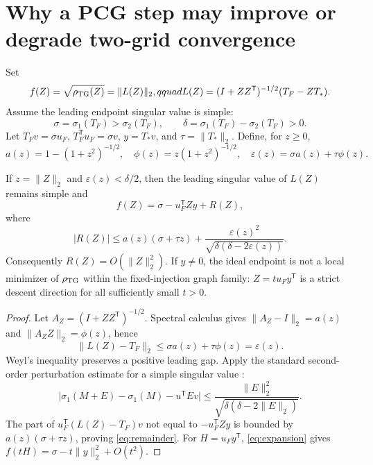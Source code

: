 \documentclass[smallextended]{svjour3}
\newcommand{\T}{\mathsf{T}}
\newcommand{\norm}[1]{\lVert#1\rVert}
\newcommand{\abs}[1]{\lvert#1\rvert}
\begin{document}
\section{Why a PCG step may improve or degrade two-grid convergence}\label{sec:local}
Set
\begin{equation}\label{eq:L}
 f(Z)=\sqrt{\rho_{\rm TG}(Z)}=\norm{L(Z)}_2,qquad
 L(Z)=(I+ZZ^\T)^{-1/2}(T_F-ZT_*).
\end{equation}
Assume the leading endpoint singular value is simple:
\begin{equation}\label{eq:gap}
 \sigma=\sigma_1(T_F)>\sigma_2(T_F),\qquad
 \delta=\sigma_1(T_F)-\sigma_2(T_F)>0.
\end{equation}
Let $T_Fv=\sigma u_F$, $T_F^{\T}u_F=\sigma v$, $y=T_*v$, and $\tau=\norm{T_*}_2$. Define, for $z\ge0$,
\begin{equation}\label{eq:eps}
 a(z)=1-(1+z^2)^{-1/2},\quad
 \phi(z)=z(1+z^2)^{-1/2},\quad
 \varepsilon(z)=\sigma a(z)+\tau\phi(z).
\end{equation}

\begin{theorem}\label{thm:expansion}
If $z=\norm Z_2$ and $\varepsilon(z)<\delta/2$, then the leading singular value of $L(Z)$ remains simple and
\begin{equation}\label{eq:expansion}
 f(Z)=\sigma-u_F^{\T}Zy+R(Z),
\end{equation}
where
\begin{equation}\label{eq:remainder}
 \abs{R(Z)}\le
 a(z)(\sigma+\tau z)+
 \frac{\varepsilon(z)^2}{\sqrt{\delta(\delta-2\varepsilon(z))}}.
\end{equation}
Consequently $R(Z)=O(\norm Z_2^2)$. If $y\ne0$, the ideal endpoint is not a local minimizer of $\rho_{\rm TG}$ within the fixed-injection graph family: $Z=t u_Fy^\T$ is a strict descent direction for all sufficiently small $t>0$.
\end{theorem}
\begin{proof}
Let $A_Z=(I+ZZ^\T)^{-1/2}$. Spectral calculus gives
$\norm{A_Z-I}_2=a(z)$ and $\norm{A_ZZ}_2=\phi(z)$, hence
\begin{equation*}
 \norm{L(Z)-T_F}_2\le\sigma a(z)+\tau\phi(z)=\varepsilon(z).
\end{equation*}
Weyl's inequality preserves a positive leading gap. Apply the standard second-order perturbation estimate for a simple singular value \cite{stewart1990perturbation}:
\begin{equation*}
 \abs{\sigma_1(M+E)-\sigma_1(M)-u^{\T}Ev}
 \le\frac{\norm E_2^2}{\sqrt{\delta(\delta-2\norm E_2)}}.
\end{equation*}
The part of $u_F^{\T}(L(Z)-T_F)v$ not equal to $-u_F^{\T}Zy$ is bounded by $a(z)(\sigma+\tau z)$, proving \eqref{eq:remainder}. For $H=u_Fy^{\T}$, \eqref{eq:expansion} gives
$f(tH)=\sigma-t\norm y_2^2+O(t^2)$.
\end{proof}
\end{document}
